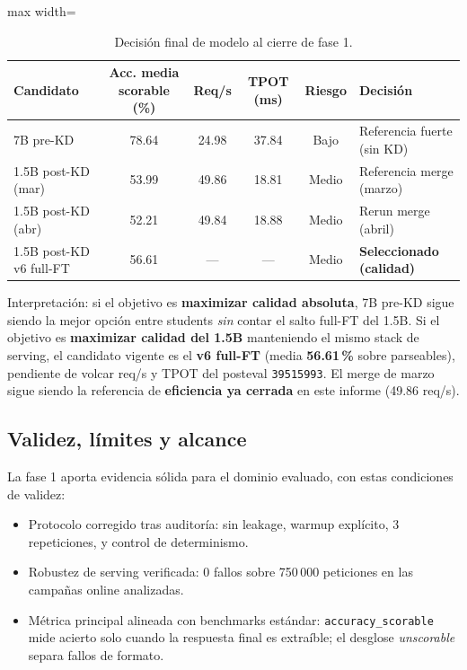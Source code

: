 \documentclass[11pt,a4paper]{article}
\begin{document}
\begin{table}[H]
\centering
\caption{Decisi\'on final de modelo al cierre de fase 1.}
\label{tab:final-decision}
\begin{adjustbox}{max width=\textwidth}
\begin{tabular}{lccccl}
\toprule
\textbf{Candidato} & \textbf{Acc. media scorable (\%)} & \textbf{Req/s} & \textbf{TPOT (ms)} & \textbf{Riesgo} & \textbf{Decisi\'on} \\
\midrule
7B pre-KD                  & 78.64 & 24.98 & 37.84 & Bajo & Referencia fuerte (sin KD) \\
1.5B post-KD (mar)         & 53.99 & 49.86 & 18.81 & Medio & Referencia merge (marzo) \\
1.5B post-KD (abr)         & 52.21 & 49.84 & 18.88 & Medio & Rerun merge (abril) \\
1.5B post-KD v6 full-FT    & 56.61 & ---   & ---   & Medio & \textbf{Seleccionado (calidad)} \\
\bottomrule
\end{tabular}
\end{adjustbox}
\end{table}

Interpretaci\'on: si el objetivo es \textbf{maximizar calidad absoluta},
7B pre-KD sigue siendo la mejor opci\'on entre students \emph{sin}
contar el salto full-FT del 1.5B. Si el objetivo es
\textbf{maximizar calidad del 1.5B} manteniendo el mismo stack de
serving, el candidato vigente es el \textbf{v6 full-FT} (media
\textbf{56.61\,\%} sobre parseables), pendiente de volcar req/s y TPOT del posteval
\texttt{39515993}. El merge de marzo sigue siendo la referencia de
\textbf{eficiencia ya cerrada} en este informe (49.86 req/s).

\subsection{Validez, l\'imites y alcance}

La fase 1 aporta evidencia s\'olida para el dominio evaluado, con estas
condiciones de validez:
\begin{itemize}
  \item Protocolo corregido tras auditor\'ia: sin leakage,
    warmup expl\'icito, 3 repeticiones, y control de determinismo.
  \item Robustez de serving verificada: 0 fallos sobre 750\,000 peticiones
    en las campa\~nas online analizadas.
  \item M\'etrica principal alineada con benchmarks est\'andar:
    \texttt{accuracy\_scorable} mide acierto solo cuando la respuesta final
    es extra\'ible; el desglose \emph{unscorable} separa fallos de formato.
\end{itemize}
\end{document}
